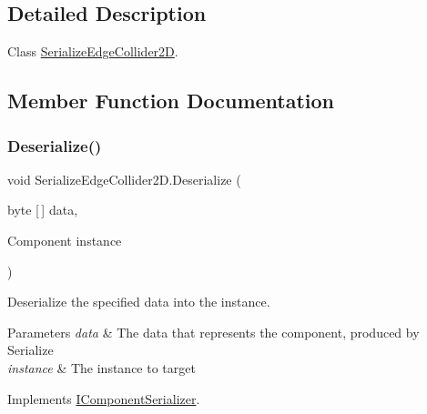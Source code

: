 \subsection{Detailed Description}
Class \hyperlink{class_serialize_edge_collider2_d}{Serialize\+Edge\+Collider2D}. 



\subsection{Member Function Documentation}
\mbox{\label{class_serialize_edge_collider2_d_a6abc37b6168840eaea4bf0bdbdc4c624}} 
\subsubsection{\texorpdfstring{Deserialize()}{Deserialize()}}
{\footnotesize\ttfamily void Serialize\+Edge\+Collider2\+D.\+Deserialize (\begin{DoxyParamCaption}\item[{byte \mbox{[}$\,$\mbox{]}}]{data,  }\item[{Component}]{instance }\end{DoxyParamCaption})\hspace{0.3cm}{\ttfamily [inline]}}



Deserialize the specified data into the instance. 


\begin{DoxyParams}{Parameters}
{\em data} & The data that represents the component, produced by Serialize\\
\hline
{\em instance} & The instance to target\\
\hline
\end{DoxyParams}


Implements \hyperlink{interface_i_component_serializer_a4cc366a5c78b33d47a90c209d8fed883}{I\+Component\+Serializer}.

\mbox{\label{class_serialize_edge_collider2_d_aa0efa9c04d2981e21c8d7a66003b1cf9}} 
